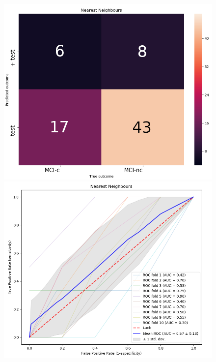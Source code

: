 \begin{figure}[h]
\begin{minipage}{.5\textwidth}
		\end{minipage}
	\end{figure}


	\FloatBarrier


	\begin{figure}[h]
		\centering
		\begin{minipage}{.5\textwidth}
			\centering
			\includegraphics[width=1\linewidth]{fig_NN_fMRI_nodimreduc_CONFUSION.png}
		\end{minipage}%
		\begin{minipage}{.5\textwidth}
			\centering
			\includegraphics[width=1\linewidth]{fig_NN_fMRI_nodimreduc_ROC.png}
		\end{minipage}
	\end{figure}





